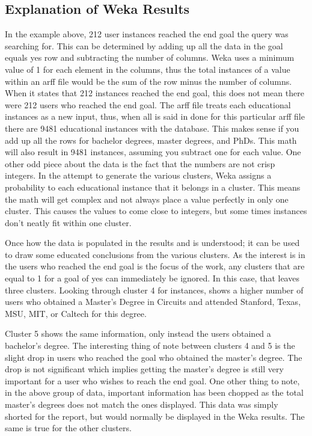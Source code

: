 \subsection{Explanation of Weka Results}
In the example above, 212 user instances reached the end goal the query was
searching for.  This can be determined by adding up all the data in the goal
equals yes row and subtracting the number of columns.  Weka uses a minimum value of 1 for
each element in the columns, thus the total instances of a value within an arff
file would be the sum of the row minus the number of columns.  When it states that 212
instances reached the end goal, this does not mean there were 212 users who
reached the end goal.  The arff file treats each educational instances as a new
input, thus, when all is said in done for this particular arff file there are
9481 educational instances with the database.  This makes sense if you add up
all the rows for bachelor degrees, master degrees, and PhDs.  This math will
also result in 9481 instances, assuming you subtract one for each value.  One
other odd piece about the data is the fact that the numbers are not crisp
integers.  In the attempt to generate the various clusters, Weka assigns a
probability to each educational instance that it belongs in a cluster.  This
means the math will get complex and not always place a value perfectly in only
one cluster.  This causes the values to come close to integers, but some times
instances don't neatly fit within one cluster.

Once how the data is populated in the results and is understood; it can be used
to draw some educated conclusions from the various clusters.  As the interest
is in the users who reached the end goal is the focus of the work, any clusters that are equal to
1 for a goal of yes can immediately be ignored.  In this case, that leaves three
clusters.  Looking through cluster 4 for instances, shows a higher number of
users who obtained a Master's Degree in Circuits and attended Stanford, Texas,
MSU, MIT, or Caltech for this degree.  

Cluster 5 shows the same information, only instead the users obtained a
bachelor's degree.  The interesting thing of note between clusters 4 and 5 is
the slight drop in users who reached the goal who obtained the master's degree. 
The drop is not significant which implies getting the master's degree is still
very important for a user who wishes to reach the end goal.  One other thing to note,
in the above group of data, important information has been chopped as the total
master's degrees does not match the ones displayed.  This data was simply
shorted for the report, but would normally be displayed in the Weka results.  The same
is true for the other clusters.  

